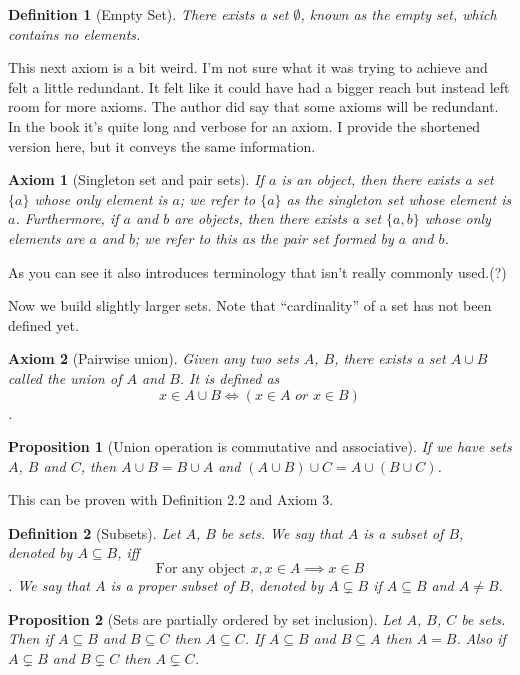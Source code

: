 \documentclass[12pt]{article}
\newtheorem{axiom}{Axiom}
\newtheorem{proposition}{Proposition}[section]
\newtheorem{definition}{Definition}[section]
\theoremstyle{remark}
\begin{document}
\begin{definition}[Empty Set]
    There exists a set $ \emptyset $, known as the empty set, which contains no elements. 
\end{definition}

This next axiom is a bit weird. I'm not sure what it was trying to achieve and felt a little redundant. It felt like it could have had a bigger reach but instead left room for more axioms. The author did say that some axioms will be redundant. In the book it's quite long and verbose for an axiom. I provide the shortened version here, but it conveys the same information. 

\begin{axiom}[Singleton set and pair sets]
	If $ a $ is an object, then there exists a set $ \{a\} $ whose only element is $ a $; we refer to $ \{a\} $ as the singleton set whose element is $ a $. Furthermore, if $ a $ and $ b $ are objects, then there exists a set $ \{a,b\} $ whose only elements are $ a $ and $ b $; we refer to this as the pair set formed by $ a $ and $ b $.
\end{axiom}

As you can see it also introduces terminology that isn't really commonly used.(?) \par 

Now we build slightly larger sets. Note that ``cardinality'' of a set has not been defined yet. 

\begin{axiom}[Pairwise union]
	Given any two sets $ A $, $ B $, there exists a set $ A \cup B $ called the union of $ A $ and $ B $. It is defined as \[ x \in A \cup B \iff (x \in A \textit{ or } x \in B) \].
\end{axiom}

\begin{proposition}[Union operation is commutative and associative]
    If we have sets $ A $, $ B $ and $ C $, then $ A \cup B = B \cup A $ and $ (A \cup B) \cup C = A \cup (B \cup C) $.
\end{proposition}

This can be proven with Definition 2.2 and Axiom 3.


\begin{definition}[Subsets]
	Let $ A $, $ B $ be sets. We say that $ A $ is a \textit{subset} of $ B $, denoted by $ A \subseteq B $, iff \[ \text{For any object } x, x \in A \implies x \in B \].
	We say that $ A $ is a proper subset of $ B $, denoted by $ A \subsetneq B $ if $ A \subseteq B $ and $ A \neq B $.
\end{definition}


\begin{proposition}[Sets are partially ordered by set inclusion]
    Let $ A $, $ B $, $ C $ be sets. Then if $ A \subseteq B $ and $ B \subseteq C $ then $ A \subseteq C $. If $ A \subseteq B $ and $ B \subseteq A $ then $ A = B $. Also if $ A \subsetneq B $ and $ B \subsetneq C $ then $ A \subsetneq C $.
\end{proposition}
\end{document}
